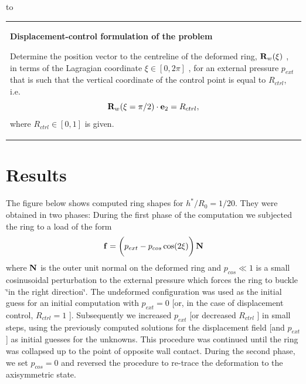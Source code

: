 to

\begin{center} \tabulinesep=1mm
\begin{longtabu} spread 0pt [c]{*{1}{|X[-1]}|}
\hline


\begin{center} {\bfseries  Displacement-\/control formulation of the problem} \end{center} 

Determine the position vector to the centreline of the deformed ring, $ {\bf R}_w(\xi) $ , in terms of the Lagragian coordinate $ \xi \in [0,2\pi] $ , for an external pressure $ p_{ext} $ that is such that the vertical coordinate of the control point is equal to $ R_{ctrl} $, i.\+e. \[ {\bf R}_w(\xi=\pi/2) \cdot {\bf e}_2 = R_{ctrl}, \] where $ R_{ctrl} \in [0,1] $ is given.

\\
\end{longtabu}
\end{center} 



\hypertarget{index_results}{}\section{Results}\label{index_results}
The figure below shows computed ring shapes for $ h^*/R_0 = 1/20 $. They were obtained in two phases\+: During the first phase of the computation we subjected the ring to a load of the form \[ {\bf f} = \bigg( p_{ext} - p_{cos} \cos(2 \xi) \bigg) \, {\bf N} \] where $ {\bf N} $ is the outer unit normal on the deformed ring and $ p_{cos} \ll 1 $ is a small cosinusoidal perturbation to the external pressure which forces the ring to buckle \char`\"{}in the right direction\char`\"{}. The undeformed configuration was used as the initial guess for an initial computation with $ p_{ext} = 0$ \mbox{[}or, in the case of displacement control, $ R_{ctrl} = 1$ \mbox{]}. Subsequently we increased $ p_{ext} $ \mbox{[}or decreased $ R_{ctrl}$ \mbox{]} in small steps, using the previously computed solutions for the displacement field \mbox{[}and $ p_{ext} $ \mbox{]} as initial guesses for the unknowns. This procedure was continued until the ring was collapsed up to the point of opposite wall contact. During the second phase, we set $ p_{cos} = 0$ and reversed the procedure to re-\/trace the deformation to the axisymmetric state.

